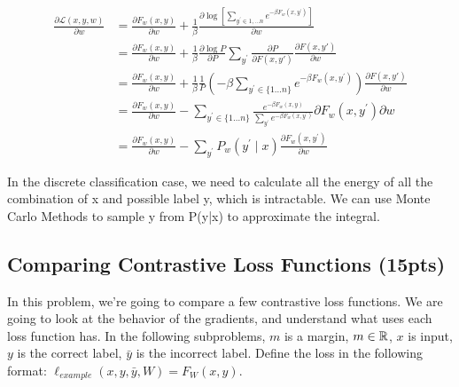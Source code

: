 \begin{align}
    \frac{\partial \mathcal{L}(x, y, w)}{\partial w}
     & = \frac{\partial F_w(x, y)}{\partial w}
    + \frac{1}{\beta}
    \frac{\partial \log  \left[
            \sum_{y^{\prime} \in {1,...n}} e^{-\beta F_{w}\left(x, y^{\prime}\right)}
    \right] }{\partial w}                                                                                                       \\
     & = \frac{\partial F_w(x, y)}{\partial w}
    + \frac{1}{\beta}
    \frac{\partial \log P}{\partial P} \sum_{y^{\prime}} \frac{\partial P}{\partial F(x,y')}\frac{\partial F(x,y')}{\partial w} \\
     & = \frac{\partial F_w(x, y)}{\partial w}
    + \frac{1}{\beta}
    \frac{1}{P} (-\beta \sum_{y^{\prime} \in \{1 \ldots n\}} e^{-\beta F_{w}\left(x, y^{\prime}\right)})
    \frac{\partial F(x,y')}{\partial w}                                                                                         \\
     & = \frac{\partial F_w(x, y)}{\partial w}
    - \sum_{y^{\prime} \in \{1 \ldots n\}}
    \frac{e^{-\beta F_{w}(x, y)}}
    {\sum_{y^{\prime}} e^{-\beta F_{w}\left(x, y^{\prime}\right)}}
    {\partial F_{w}\left(x, y^{\prime}\right)}{\partial w}                                                                      \\
     & = \frac{\partial F_w(x, y)}{\partial w}
    - \sum_{y^{\prime}} P_{w}\left(y^{\prime} \mid x\right) \frac{\partial F_{w}\left(x, y^{\prime}\right)}{\partial w}
\end{align}

In the discrete classification case, we need to calculate all the energy of all the combination of x and possible label y, which is intractable. We can use Monte Carlo Methods to sample y from P(y|x) to approximate the integral.


\subsection{Comparing Contrastive Loss Functions (15pts)}

In this problem, we're going to compare a few contrastive loss functions. We are going to look at the behavior of the gradients, and understand what uses each loss function has. In the following subproblems, $m$ is a margin, $m \in \mathbb{R}$, $x$ is input, $y$ is the correct label, $\bar y$ is the incorrect label. Define the loss in the following format: $\ell_{example}(x, y, \bar y, W) = F_W(x, y)$.

